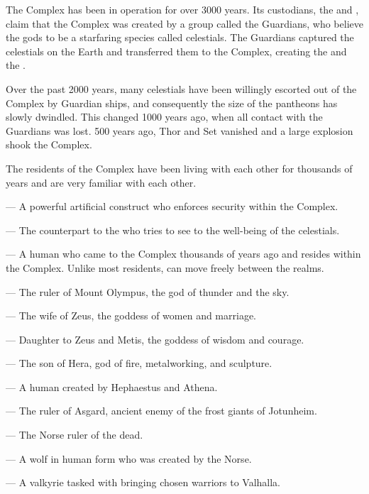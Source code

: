 \documentclass[blue]{guardians}
\begin{document}
\name{\bWhosWho{}}

The Complex has been in operation for over 3000 years. Its custodians, the \cCaretaker{} and \cWarden{}, claim that the Complex was created by a group called the Guardians, who believe the gods to be a starfaring species called celestials. The Guardians captured the celestials on the Earth and transferred them to the Complex, creating the \cCaretaker{} and the \cWarden{}.

Over the past 2000 years, many celestials have been willingly escorted out of the Complex by Guardian ships, and consequently the size of the pantheons has slowly dwindled. This changed 1000 years ago, when all contact with the Guardians was lost. 500 years ago, Thor and Set vanished and a large explosion shook the Complex.

The residents of the Complex have been living with each other for thousands of years and are very familiar with each other.

\begin{itemz}
\item \cWarden{} --- A powerful artificial construct who enforces security within the Complex.
 \item \cCaretaker{} --- The counterpart to the \cWarden{} who tries to see to the well-being of the celestials.
 \item \cJascha{} --- A human who came to the Complex thousands of years ago and resides within the Complex. Unlike most residents, \cJascha{\they} can move freely between the realms.
\end{itemz}

\begin{itemz}
  \item \cZeus{} --- The ruler of Mount Olympus, the god of thunder and the sky.
  \item \cHera{} --- The wife of Zeus, the goddess of women and marriage.
  \item \cAthena{} --- Daughter to Zeus and Metis, the goddess of wisdom and courage.
  \item \cHephaestus{} --- The son of Hera, god of fire, metalworking, and sculpture.
  \item \cPandora{} --- A human created by Hephaestus and Athena.
\end{itemz}

\begin{itemz}
  \item \cOdin{} --- The ruler of Asgard, ancient enemy of the frost giants of Jotunheim.
  \item \cHel{} --- The Norse ruler of the dead.
  \item \cFenrir{} --- A wolf in human form who was created by the Norse.
  \item \cVal{} --- A valkyrie tasked with bringing chosen warriors to Valhalla.
\end{itemz}
\end{document}
